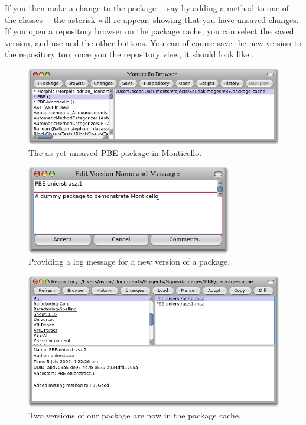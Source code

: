\documentclass[a4paper,10pt,twoside]{book}
\begin{document}
If you then make a change to the package\,---\,say by adding a method to one of the classes\,---\,the asterisk will re-appear, showing that you have unsaved changes.  If you open a repository browser on the package cache, you can select the saved version, and use  and the other buttons.  
You can of course save the new version to the repository too; once you  the repository view, it should look like .

\begin{figure}[tbp]
	\begin{center}
		\includegraphics[width=\textwidth]{MC+PBE}
	\end{center}
	\caption{The as-yet-unsaved PBE package in Monticello.}
\end{figure}

\begin{figure}[tbp]
	\begin{center}
	\includegraphics[width=0.8\textwidth]{PBE-on}
	\end{center}
	\caption{Providing a log message for a new version of a package.}
\end{figure}

\begin{figure}[tbp]
	\begin{center}
	\includegraphics[width=\textwidth]{package-cache-browser}
	\end{center}
	\caption{Two versions of our package are now in the package cache.}
\end{figure}
\end{document}
